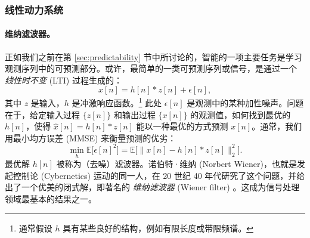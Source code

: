 \documentclass[../../book-main.tex]{subfiles}
\begin{document}

\subsubsection{线性动力系统}
\label{sec:linear-systems}

\paragraph{维纳滤波器。}

正如我们之前在第 \ref{sec:predictability} 节中所讨论的，智能的一项主要任务是学习观测序列中的可预测部分。或许，最简单的一类可预测序列或信号，是通过一个 {\em 线性时不变} (LTI) 过程生成的：
\begin{equation}
    x[n] = h[n]*z[n] + \epsilon[n], 
    \label{eqn:Wiener-model}
\end{equation}
其中 $z$ 是输入，$h$ 是冲激响应函数。\footnote{通常假设 $h$ 具有某些良好的结构，例如有限长度或带限频谱。} 此处 $\epsilon[n]$ 是观测中的某种加性噪声。问题在于，给定输入过程 $\{z[n]\}$ 和输出过程 $\{x[n]\}$ 的观测值，如何找到最优的 $h[n]$，使得 $\hat x[n] = h[n]*z[n]$ 能以一种最优的方式预测 $x[n]$。通常，我们用最小均方误差 (MMSE) 来衡量预测的优劣：
\begin{equation}
    \min_{h} \mathbb{E} \big[\epsilon[n]^2\big] = \mathbb{E} \big[\|x[n] - h[n]*z[n]\|_2^2\big].
\end{equation}
最优解 $h[n]$ 被称为（去噪）滤波器。诺伯特·维纳 (Norbert Wiener)，也就是发起控制论 (Cybernetics) 运动的同一人，在 20 世纪 40 年代研究了这个问题，并给出了一个优美的闭式解，即著名的 {\em 维纳滤波器} (Wiener filter) \cite{Wiener-1942,Wiener-1949}。这成为信号处理领域最基本的结果之一。
\end{document}
